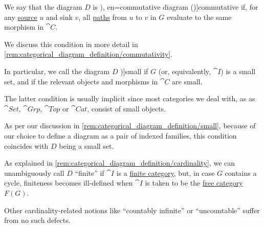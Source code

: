 \begin{definition}
\begin{thmenum}
     We say that the diagram \( D \) is \term[ru=коммутативная диаграмма (\cite[50]{Хелемский2014ФункциональныйАнализ}), en=commutative diagram (\cite[def. 6.2.5]{Schubert1972Categories})]{commutative} if, for any \hyperref[def:graph_source_and_sink]{source} \( u \) and sink \( v \), all \hyperref[def:graph_walk/path]{paths} from \( u \) to \( v \) in \( G \) evaluate to the same morphism in \( \cat{C} \).

    We discuss this condition in more detail in \cref{rem:categorical_diagram_definition/commutativity}.

     In particular, we call the diagram \( D \) \term[en=small diagram (\cite[109]{MacLane1998CategoryTheory})]{small} if \( G \) (or, equivalently, \( \cat{I} \)) is a small set, and if the relevant objects and morphisms in \( \cat{C} \) are small.

    The latter condition is usually implicit since most categories we deal with, as as \( \cat{Set} \), \( \cat{Grp} \), \( \cat{Top} \) or \( \cat{Cat} \), consist of small objects.

    As per our discussion in \cref{rem:categorical_diagram_definition/small}, because of our choice to define a diagram as a pair of indexed families, this condition coincides with \( D \) being a small set.

     As explained in \cref{rem:categorical_diagram_definition/cardinality}, we can unambiguously call \( D \) \enquote{finite} if \( \cat{I} \) is a \hyperref[def:category_cardinality]{finite category}, but, in case \( G \) contains a cycle, finiteness becomes ill-defined when \( \cat{I} \) is taken to be the \hyperref[def:free_category]{free category} \( F(G) \).

    Other cardinality-related notions like \enquote{countably infinite} or \enquote{uncountable} suffer from no such defects.
  \end{thmenum}
\end{definition}

